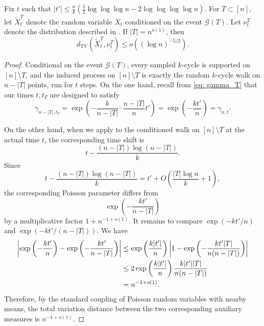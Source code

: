 \begin{lemma}\label{lem: conditioned}
Fix $t$ such that $|t'|\leq \frac{n}{k}(\frac{1}{2}\log\log\log n-2\log\log\log\log n)$. For $T \subset [n]$, let $\tilde{X}_t^{T}$ denote the random variable $X_t$ conditioned on the event $\mathcal{G}(T)$. Let $\nu_t^T$ denote the distribution described in . If $|T| = n^{o(1)}$, then
\[
d_{\mathrm{TV}}(\tilde{X}_t^T, \nu_t^T) \leq o\left((\log n)^{-5/2}\right).
\]
\end{lemma}

\begin{proof}
    Conditional on the event $\mathcal{G}(T)$, every sampled $k$-cycle is supported on $[n]\setminus T$, and the induced process on $[n]\setminus T$ is exactly the random $k$-cycle walk on $n-|T|$ points, run for $t$ steps.
    On the one hand, recall from \eqref{eq: gamma_T} that our times $t,t_T$ are designed to satisfy
    $$
        \gamma_{n-|T|,t_T}
        =
        \exp\left(
        -\frac{k}{n-|T|}\cdot \frac{n-|T|}{n}t'
        \right)
        =
        \exp\left(-\frac{kt'}{n}\right)
        =
        \gamma_{n,t}.
    $$

    On the other hand, when we apply  to the conditioned walk on
    $[n]\setminus T$ at the actual time $t$, the corresponding time shift is
    $$
        t-\frac{(n-|T|)\log(n-|T|)}{k}.
    $$
    Since
    $$
        t-\frac{(n-|T|)\log(n-|T|)}{k}=t'+O\left(\frac{|T|\log n}{k}+1\right),
    $$
    the corresponding Poisson parameter differs from
    $$
        \exp\left(-\frac{kt'}{n-|T|}\right)
    $$
    by a multiplicative factor $1+n^{-1+o(1)}$. It remains to compare
    $\exp(-kt'/n)$ and $\exp(-kt'/(n-|T|))$. We have
    \begin{align}
        \left|
        \exp\left(-\frac{kt'}{n}\right)
        -
        \exp\left(-\frac{kt'}{n-|T|}\right)
        \right|
        &\leq
        \exp\left(\frac{k|t'|}{n}\right)
        \left|
        1-\exp\left(-\frac{kt'|T|}{n(n-|T|)}\right)
        \right| \notag\\
        &\leq
        2\exp\left(\frac{k|t'|}{n}\right)
        \frac{k|t'||T|}{n(n-|T|)} \notag\\
        &= n^{-1+o(1)}.
    \end{align}
    Therefore, by the standard coupling of Poisson random variables with nearby means, the total variation distance between the two corresponding auxiliary measures is $n^{-1+o(1)}$.


\end{proof}
